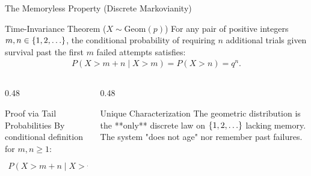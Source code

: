 \documentclass[aspectratio=169,xcolor={dvipsnames,table}]{beamer}
\begin{document}
\begin{frame}{The Memoryless Property (Discrete Markovianity)}
	\begin{block}{Time-Invariance Theorem ($X \sim \text{Geom}(p)$)}
		\small
		For any pair of positive integers $m, n \in \set{1, 2, \dots}$, the conditional probability of requiring $n$ additional trials given survival past the first $m$ failed attempts satisfies:
		\begin{align*}
			P(X > m+n \mid X > m) = P(X > n) = q^n.
		\end{align*}
	\end{block}
	\vspace{-0.15cm}
	\begin{columns}[T]
		\begin{column}{0.48\textwidth}
			\begin{exampleblock}{Proof via Tail Probabilities}
				\scriptsize
				By conditional definition for $m, n \ge 1$:
				\begin{align*}
					P(X > m+n \mid X > m) &= \dfrac{P(X > m+n)}{P(X > m)} \\
					&= \dfrac{q^{m+n}}{q^m} = q^n.
				\end{align*}
			\end{exampleblock}
		\end{column}
		\begin{column}{0.48\textwidth}
			\begin{alertblock}{Unique Characterization}
				\footnotesize
				The geometric distribution is the **only** discrete law on $\set{1, 2, \dots}$ lacking memory. The system "does not age" nor remember past failures.
			\end{alertblock}
		\end{column}
	\end{columns}
\end{frame}
\end{document}
